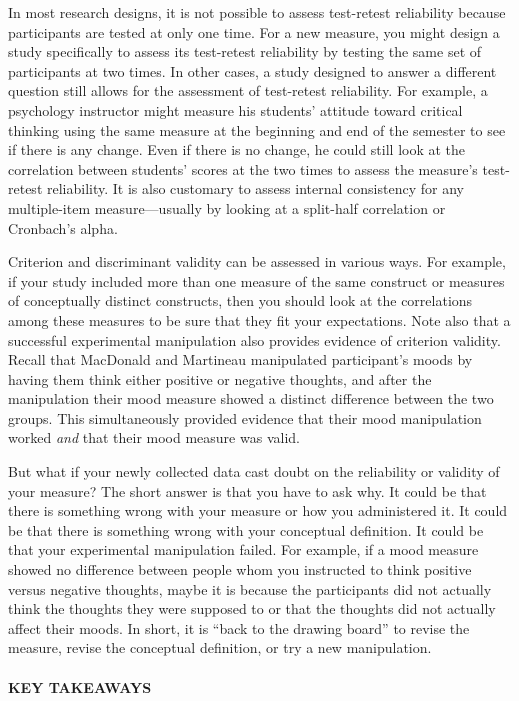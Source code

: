 \documentclass[
]{krantz}
\begin{document}
In most research designs, it is not possible to assess test-retest reliability because participants are tested at only one time. For a new measure, you might design a study specifically to assess its test-retest reliability by testing the same set of participants at two times. In other cases, a study designed to answer a different question still allows for the assessment of test-retest reliability. For example, a psychology instructor might measure his students' attitude toward critical thinking using the same measure at the beginning and end of the semester to see if there is any change. Even if there is no change, he could still look at the correlation between students' scores at the two times to assess the measure's test-retest reliability. It is also customary to assess internal consistency for any multiple-item measure---usually by looking at a split-half correlation or Cronbach's alpha.

Criterion and discriminant validity can be assessed in various ways. For example, if your study included more than one measure of the same construct or measures of conceptually distinct constructs, then you should look at the correlations among these measures to be sure that they fit your expectations. Note also that a successful experimental manipulation also provides evidence of criterion validity. Recall that MacDonald and Martineau manipulated participant's moods by having them think either positive or negative thoughts, and after the manipulation their mood measure showed a distinct difference between the two groups. This simultaneously provided evidence that their mood manipulation worked \emph{and} that their mood measure was valid.

But what if your newly collected data cast doubt on the reliability or validity of your measure? The short answer is that you have to ask why. It could be that there is something wrong with your measure or how you administered it. It could be that there is something wrong with your conceptual definition. It could be that your experimental manipulation failed. For example, if a mood measure showed no difference between people whom you instructed to think positive versus negative thoughts, maybe it is because the participants did not actually think the thoughts they were supposed to or that the thoughts did not actually affect their moods. In short, it is ``back to the drawing board'' to revise the measure, revise the conceptual definition, or try a new manipulation.

\paragraph*{KEY TAKEAWAYS}\label{key-takeaways-11}
\end{document}
